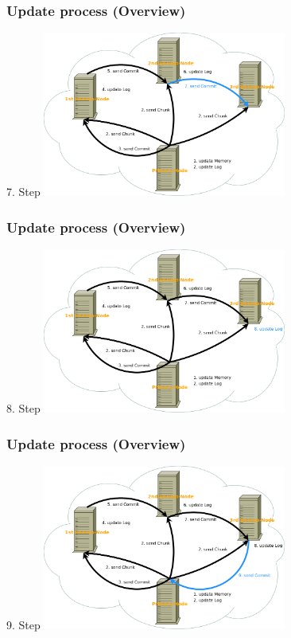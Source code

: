 \documentclass{beamer}
\begin{document}
	\begin{frame}
		\frametitle{Update process (Overview)}

		\begin{block}{7. Step}
			\center\includegraphics[width=8cm]{./img/Log_Overview_07}
		\end{block}
	\end{frame}

	\begin{frame}
		\frametitle{Update process (Overview)}

		\begin{block}{8. Step}
			\center\includegraphics[width=8cm]{./img/Log_Overview_08}
		\end{block}
	\end{frame}

	\begin{frame}
		\frametitle{Update process (Overview)}

		\begin{block}{9. Step}
			\center\includegraphics[width=8cm]{./img/Log_Overview_09}
		\end{block}
	\end{frame}
\end{document}
